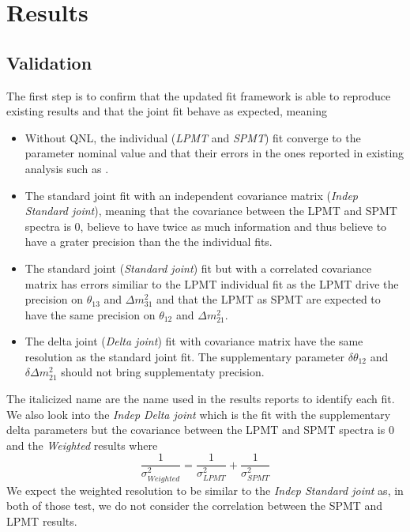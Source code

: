 \documentclass[../main.tex]{subfiles}
\begin{document}
\section{Results}
\label{sec:joint_fit:results}
%
%
%

\subsection{Validation}

The first step is to confirm that the updated fit framework is able to reproduce existing results and that the joint fit behave as expected, meaning
\begin{itemize}
  \item Without QNL, the individual (\textit{LPMT} and \textit{SPMT}) fit converge to the parameter nominal value and that their errors in the ones reported in existing analysis such as \cite{juno_collaboration_sub-percent_2022}.
  \item The standard joint fit with an independent covariance matrix (\textit{Indep Standard joint}), meaning that the covariance between the LPMT and SPMT spectra is 0, believe to have twice as much information and thus believe to have a grater precision than the the individual fits.
  \item The standard joint (\textit{Standard joint}) fit but with a correlated covariance matrix has errors similiar to the LPMT individual fit as the LPMT drive the precision on $\theta_{13}$ and $\Delta m^2_{31}$ and that the LPMT as SPMT are expected to have the same precision on $\theta_{12}$ and $\Delta m^2_{21}$.
  \item The delta joint (\textit{Delta joint}) fit with covariance matrix have the same resolution as the standard joint fit. The supplementary parameter $\delta \theta_{12}$ and $\delta \Delta m^2_{21}$ should not bring supplementaty precision.
\end{itemize}

The italicized name are the name used in the results reports to identify each fit. We also look into the \textit{Indep Delta joint} which is the fit with the supplementary delta parameters but the covariance between the LPMT and SPMT spectra is 0 and the \textit{Weighted} results where
\begin{equation}
  \frac{1}{\sigma^2_{Weighted}} = \frac{1}{\sigma^2_{LPMT}} + \frac{1}{\sigma^2_{SPMT}}
\end{equation}
We expect the weighted resolution to be similar to the \textit{Indep Standard joint} as, in both of those test, we do not consider the correlation between the SPMT and LPMT results.
\end{document}
